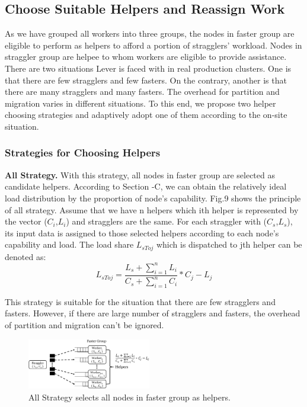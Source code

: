 \documentclass[10pt,conference,compsocconf,letterpaper]{IEEEtran}
\begin{document}
\subsection{Choose Suitable Helpers and Reassign Work}

  As we have grouped all workers into three groups, the nodes in faster group are eligible to perform as helpers to afford a portion of stragglers' workload. Nodes in straggler group are helpee to whom workers are eligible to provide assistance. There are two situations Lever is faced with in real production clusters. One is that there are few stragglers and few fasters. On the contrary, another is that there are many stragglers and many fasters. The overhead for partition and migration varies in different situations. To this end, we propose two helper choosing strategies and adaptively adopt one of them according to the on-site situation.

\subsubsection{Strategies for Choosing Helpers}

  \textbf{All Strategy.} With this strategy, all nodes in faster group are selected as candidate helpers. According to Section \uppercase\expandafter{}-C, we can obtain the relatively ideal load distribution by the proportion of node's capability. Fig.9 shows the principle of all strategy. Assume that we have n helpers which ith helper is represented by the vector (\emph{$C_i$},\emph{$L_i$}) and stragglers are the same. For each straggler with (\emph{$C_s$},\emph{$L_s$}), its input data is assigned to those selected helpers according to each node's capability and load. The load share \emph{{$L_{sToj}$}} which is dispatched to jth helper can be denoted as:
  \begin{equation}
  L_{sToj} = \frac{L_s + \sum_{i=1}^n L_i}{C_s + \sum_{i=1}^n C_i}*C_j - L_j
  \end{equation}

  This strategy is suitable for the situation that there are few stragglers and fasters. However, if there are large number of stragglers and fasters, the overhead of partition and migration can't be ignored.
  \begin{figure}[htbp]
    \centering
    \includegraphics[width=0.48\textwidth]{FigureS1}
    \caption{All Strategy selects all nodes in faster group as helpers.}
    \label{Fig. 9:}
  \end{figure}
\end{document}
